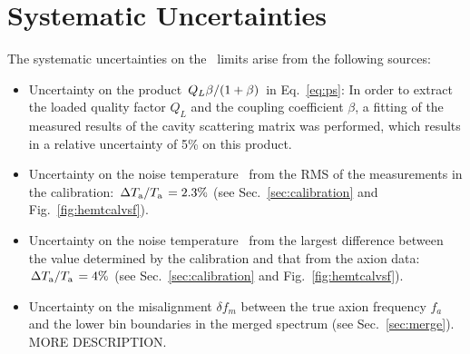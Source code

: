\section{Systematic Uncertainties} \label{sec:sys}
The systematic uncertainties on the \gagg\ limits arise from the 
following sources:
\begin{itemize}
\item Uncertainty on the product 
$\left.Q_L\beta\middle/\left(1+\beta\right)\right.$ in Eq.~\eqref{eq:ps}: 
In order to extract the loaded quality factor $Q_L$ and the coupling 
coefficient $\beta$, a fitting of the measured results of the cavity 
scattering matrix was performed, which results in a relative uncertainty of 
5\% on this product. 

\item Uncertainty on the noise temperature \ta\ from the RMS of 
the measurements in the calibration: 
$\left. \Delta T_\text{a}\middle/T_\text{a}\right.= 2.3\%$ 
(see Sec.~\ref{sec:calibration} and Fig.~\ref{fig:hemtcalvsf}).

\item Uncertainty on the noise temperature \ta\ from the largest difference 
between the value determined by the calibration and that from the axion 
data: $\left. \Delta T_\text{a}\middle/T_\text{a}\right.= 4\%$ 
(see Sec.~\ref{sec:calibration} and Fig.~\ref{fig:hemtcalvsf}). 

\item Uncertainty on the misalignment $\delta f_m$ between the true 
axion frequency $f_a$ and the lower bin boundaries in the merged spectrum 
(see Sec.~\ref{sec:merge}). MORE DESCRIPTION.


\end{itemize}

